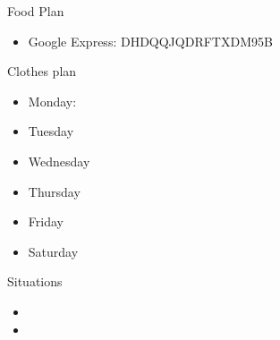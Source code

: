 \begin{columns}
    \begin{column}{0.20\linewidth}
      \begin{block}{Food Plan} 
        \begin{itemize}
          \tiny \item \tiny Google Express: DHDQQJQDRFTXDM95B
        \end{itemize}
      \end{block} 
      \begin{block}{Clothes plan} 
        \begin{itemize}
          \tiny \item \tiny Monday: 
        \item \tiny Tuesday
        \item \tiny Wednesday
        \item \tiny Thursday
        \item \tiny Friday
        \item \tiny Saturday
        \end{itemize} 
      \end{block} 
      
      \begin{block}{Situations}
        \begin{itemize}
          \tiny \item \tiny 
        \item \tiny 
        \end{itemize}
      \end{block}
    \end{column}
\end{columns}

